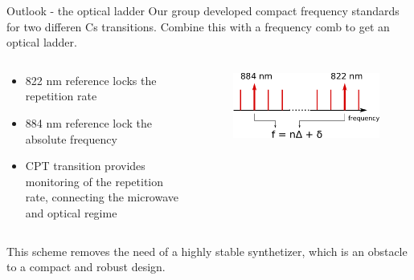 \begin{block}{Outlook - the optical ladder}
  Our group developed compact frequency standards for two differen Cs transitions. Combine this with a frequency comb to get an optical ladder.
  \begin{columns}
    \begin{column}{0.49\textwidth}
     \begin{itemize}
     \item 822 nm reference locks the repetition rate
     \item 884 nm reference lock the absolute frequency
     \item CPT transition provides monitoring of the repetition rate, connecting the microwave and optical regime
     \end{itemize}
    \end{column}
    \begin{column}{0.49\textwidth}
      \begin{figure}
        \begin{center}
          \includegraphics[width=1.0\textwidth]{figures/vernier}
        \end{center}
      \end{figure}
    \end{column}
  \end{columns}
  This scheme removes the need of a highly stable synthetizer, which is an obstacle to a compact and robust design.
\end{block}
